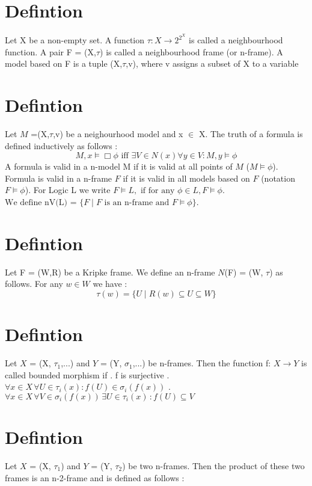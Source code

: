 \documentclass[12pt, a4paper]{scrreprt}
\begin{document}
\section{Defintion} 
Let X be a non-empty set. A function  $\tau : X \rightarrow 2^{2^X}$ is called a neighbourhood function. A pair 
F = (X,$\tau$) is called a neighbourhood frame (or n-frame). A model based on F is a tuple (X,$\tau$,v), where v assigns a subset of X to a variable

\section{Defintion}

Let $M$ =(X,$\tau$,v) be a neighourhood model and x $\in$ X. The truth of a formula is defined inductively as follows :
$$M,x \models \Box \phi \mbox{ iff } \exists V \in N(x) \forall y \in V : M,y \models \phi$$ 
A formula is valid in a n-model M if it is valid at all points of $M$ ($M \models \phi$). Formula is valid in a n-frame $F$ if it is valid in
all models based on $F$ (notation $F \models \phi$). For Logic L we write $ F \models L, \mbox{ if for any }\phi \in L, F \models \phi$. 
$\mbox{We define nV(L) =  } \{ F \mid F \mbox{ is an n-frame and } F \models \phi \}$.

\section{Defintion}
Let F = (W,R) be a Kripke frame. We define an n-frame $N$(F) = (W, $\tau$) as follows.
For any $w\in W$ we have :
$$\tau(w) = \{ U \mid R(w) \subseteq U \subseteq W \}$$

\section{Defintion}
Let $X$ = (X, $\tau_1$,...) and $Y$ = (Y, $\sigma_1$,...) be n-frames. Then the function f:
$X \rightarrow Y$ is called bounded morphism if \newline {}. f is surjective . $\forall x\in X \, \forall U \in \tau_i(x) : f(U) \in \sigma_i (f(x))$ . $\forall x\in X \, \forall V \in \sigma_i (f(x)) \, \exists U \in \tau_i(x) \, : f(U) \subseteq V$

\section {Defintion}
Let $X$ = (X, $\tau_1$) and $Y$ = (Y, $\tau_2$) be two n-frames. Then the product of these two frames
is an n-2-frame and is defined as follows : \newline
\end{document}
